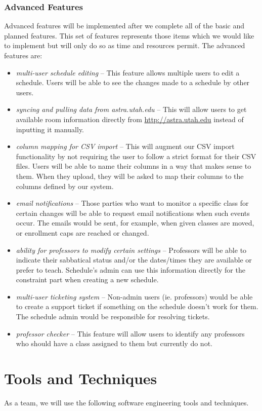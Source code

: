 \documentclass{extarticle}
\begin{document}
\subsubsection{Advanced Features}
Advanced features will be implemented after we complete all of the basic and planned features.  This set of features
represents those items which we would like to implement but will only do so as time and resources permit.  The
advanced features are:
\begin{itemize}
\item \emph{multi-user schedule editing} -- This feature allows multiple users to edit a schedule. Users will be able to
see the changes made to a schedule by other users.
\item \emph{syncing and pulling data from astra.utah.edu} -- This will allow users to get available room information
directly from \url{http://astra.utah.edu} instead of inputting it manually.
\item \emph{column mapping for CSV import} -- This will augment our CSV import functionality by not requiring the
user to follow a strict format for their CSV files.  Users will be able to name their columns in a way that makes
sense to them. When they upload, they will be asked to map their columns to the columns defined by our system.
\item \emph{email notifications} -- Those parties who want to monitor a specific class for certain changes will be
able to request email notifications when such events occur.  The emails would be sent, for example, when given
classes are moved, or enrollment caps are reached or changed.
\item \emph{ability for professors to modify certain settings} -- Professors will be able to indicate their sabbatical
status and/or the dates/times they are available or prefer to teach. Schedule's admin can use this information directly
for the constraint part when creating a new schedule.
\item \emph{multi-user ticketing system} -- Non-admin users (ie. professors) would be able to create a support
ticket if something on the schedule doesn't work for them. The schedule admin would be responsible for resolving tickets.
\item \emph{professor checker} -- This feature will allow users to identify any professors who should have a class
assigned to them but currently do not.
\end{itemize}

\section{Tools and Techniques}
As a team, we will use the following software engineering tools and techniques.
\end{document}
